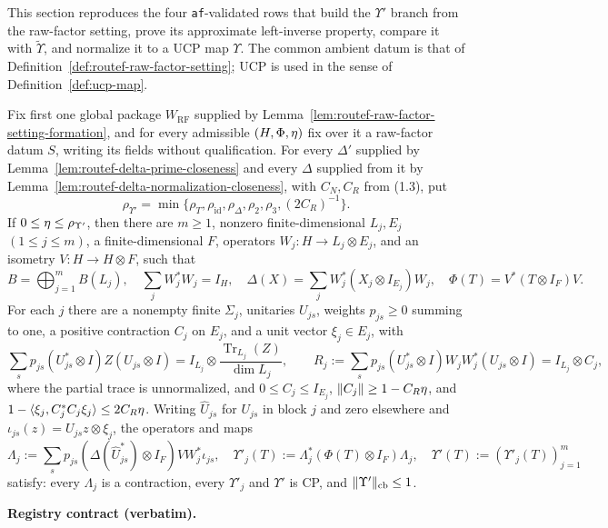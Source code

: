 This section reproduces the four \texttt{af}-validated rows that build the
$\Upsilon'$ branch from the raw-factor setting, prove its approximate left-inverse
property, compare it with $\widetilde\Upsilon$, and normalize it to a UCP map
$\Upsilon$.  The common ambient datum is that of
Definition~\ref{def:routef-raw-factor-setting}; UCP is used in the sense of
Definition~\ref{def:ucp-map}.
\begin{lemma}\label{lem:routef-upsilon-prime-component-construction}
Fix first one global package $W_{\mathrm{RF}}$ supplied by Lemma~\ref{lem:routef-raw-factor-setting-formation},
and for every admissible $(H,\Phi,\eta)$ fix over it a raw-factor datum $S$, writing
its fields without qualification.  For every $\Delta'$ supplied by Lemma~\ref{lem:routef-delta-prime-closeness}
and every $\Delta$ supplied from it by Lemma~\ref{lem:routef-delta-normalization-closeness},
with $C_N,C_R$ from (1.3), put
\[
 \rho_{\Upsilon'}=\min\{\rho_T,\rho_{\mathrm{id}},\rho_\Delta,
 \rho_2,\rho_3,(2C_R)^{-1}\}.
\]
If $0\le\eta\le\rho_{\Upsilon'}$, then there are $m\ge1$, nonzero finite-dimensional
$L_j,E_j$ $(1\le j\le m)$, a finite-dimensional $F$, operators
$W_j:H\to L_j\otimes E_j$, and an isometry $V:H\to H\otimes F$, such that
\[
 B=\bigoplus_{j=1}^{m}B(L_j),\quad \sum_jW_j^*W_j=I_H,\quad
 \Delta(X)=\sum_jW_j^*(X_j\otimes I_{E_j})W_j,\quad
 \Phi(T)=V^*(T\otimes I_F)V.
\]
For each $j$ there are a nonempty finite $\Sigma_j$, unitaries $U_{js}$, weights
$p_{js}\ge0$ summing to one, a positive contraction $C_j$ on $E_j$, and a unit
vector $\xi_j\in E_j$, with
\[
 \sum_s p_{js}(U_{js}^*\otimes I)Z(U_{js}\otimes I)
 =I_{L_j}\otimes\frac{\operatorname{Tr}_{L_j}(Z)}{\dim L_j},
 \qquad
 R_j:=\sum_s p_{js}(U_{js}^*\otimes I)W_jW_j^*(U_{js}\otimes I)
 =I_{L_j}\otimes C_j,
\]
where the partial trace is unnormalized, and $0\le C_j\le I_{E_j}$,
$\lVert C_j\rVert\ge1-C_R\eta$, and
$1-\langle\xi_j,C_j^*C_j\xi_j\rangle\le2C_R\eta$.
Writing $\widehat U_{js}$ for $U_{js}$ in block $j$ and zero elsewhere and
$\iota_{js}(z)=U_{js}z\otimes\xi_j$, the operators and maps
\[
 \Lambda_j:=\sum_s p_{js}(\Delta(\widehat U_{js}^*)\otimes I_F)VW_j^*\iota_{js},
 \quad \Upsilon'_j(T):=\Lambda_j^*(\Phi(T)\otimes I_F)\Lambda_j,
 \quad \Upsilon'(T):=(\Upsilon'_j(T))_{j=1}^{m}
\]
satisfy: every $\Lambda_j$ is a contraction, every $\Upsilon'_j$ and $\Upsilon'$ is CP,
and $\lVert \Upsilon'\rVert_{\mathrm{cb}}\le1$.
\end{lemma}
\noindent\textbf{Registry contract (verbatim).}
